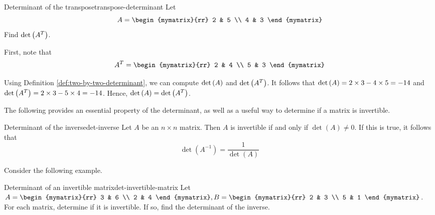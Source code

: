 \begin{example}{Determinant of the transpose}{transpose-determinant}
Let
\begin{equation*}
A
=
\begin{mymatrix}{rr}
2 & 5 \\
4 & 3
\end{mymatrix}
\end{equation*}
Find $\det \left(A^T\right)$.
\end{example}

\begin{solution}
First, note that 
\begin{equation*}
A^{T}
=
\begin{mymatrix}{rr}
2 & 4 \\
5 & 3
\end{mymatrix}
\end{equation*}

Using Definition \ref{def:two-by-two-determinant}, we can compute $\det \left(A\right)$ and $\det \left(A^T\right)$. It follows that
$\det \left(A\right) = 2 \times 3 - 4 \times 5 = -14$ and $\det \left(A^T\right) = 2 \times 3 - 5 \times 4 = -14$. 
Hence, $\det \left(A\right) = \det \left(A^T\right)$.
\end{solution}

The following provides an essential property of the determinant, as well as a useful way to determine if a matrix is invertible.

\begin{theorem}{Determinant of the inverse}{det-inverse}
Let $A$ be an $n \times n$ matrix. Then $A$ is invertible if and only if $\det(A) \neq 0$. If this is true, it follows that 
\[
\det(A^{-1}) = \frac{1}{\det(A)}
\]
\end{theorem}

Consider the following example.

\begin{example}{Determinant of an invertible matrix}{det-invertible-matrix}
Let $A = \begin{mymatrix}{rr}
3 & 6 \\
2 & 4 
\end{mymatrix}, B = \begin{mymatrix}{rr}
2 & 3 \\
5 & 1
\end{mymatrix}$. For each matrix, determine if it is invertible. If so, find the determinant of the inverse. 
\end{example}

